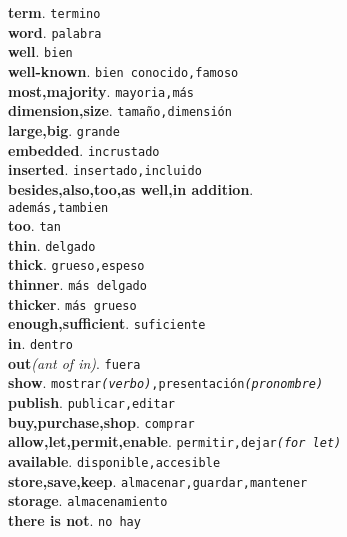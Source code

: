 \documentclass[twocolumn]{article}
\begin{document}
	\textsf{\textbf{term}}. \texttt{termino}\\
	\textsf{\textbf{word}}. \texttt{palabra}\\
	\textsf{\textbf{well}}. \texttt{bien}\\
	\textsf{\textbf{well-known}}. \texttt{bien conocido,famoso}\\
	\textsf{\textbf{most,majority}}. \texttt{mayoria,m\'as}\\
	\textsf{\textbf{dimension,size}}. \texttt{tama\~no,dimensi\'on}\\
	\textsf{\textbf{large,big}}. \texttt{grande}\\
	\textsf{\textbf{embedded}}. \texttt{incrustado}\\
	\textsf{\textbf{inserted}}. \texttt{insertado,incluido}\\
	\textsf{\textbf{besides,also,too,as well,in addition}}.\\\texttt{adem\'as,tambien}\\
	\textsf{\textbf{too}}. \texttt{tan}\\
	\textsf{\textbf{thin}}. \texttt{delgado}\\
	\textsf{\textbf{thick}}. \texttt{grueso,espeso}\\
	\textsf{\textbf{thinner}}. \texttt{m\'as delgado}\\
	\textsf{\textbf{thicker}}. \texttt{m\'as grueso}\\
	\textsf{\textbf{enough,sufficient}}. \texttt{suficiente}\\
	\textsf{\textbf{in}}. \texttt{dentro}\\
	\textsf{\textbf{out}}{\scriptsize \textit{(ant of in)}}. \texttt{fuera}\\
	\textsf{\textbf{show}}. \texttt{mostrar{\scriptsize \textit{(verbo)}},presentaci\'on{\scriptsize \textit{(pronombre)}}}\\
	\textsf{\textbf{publish}}. \texttt{publicar,editar}\\
	\textsf{\textbf{buy,purchase,shop}}. \texttt{comprar}\\
	\textsf{\textbf{allow,let,permit,enable}}. \texttt{permitir,dejar{\scriptsize \textit{(for let)}}}\\
	\textsf{\textbf{available}}. \texttt{disponible,accesible}\\
	\textsf{\textbf{store,save,keep}}. \texttt{almacenar,guardar,mantener}\\
	\textsf{\textbf{storage}}. \texttt{almacenamiento}\\
	\textsf{\textbf{there is not}}. \texttt{no hay}\\
\end{document}
